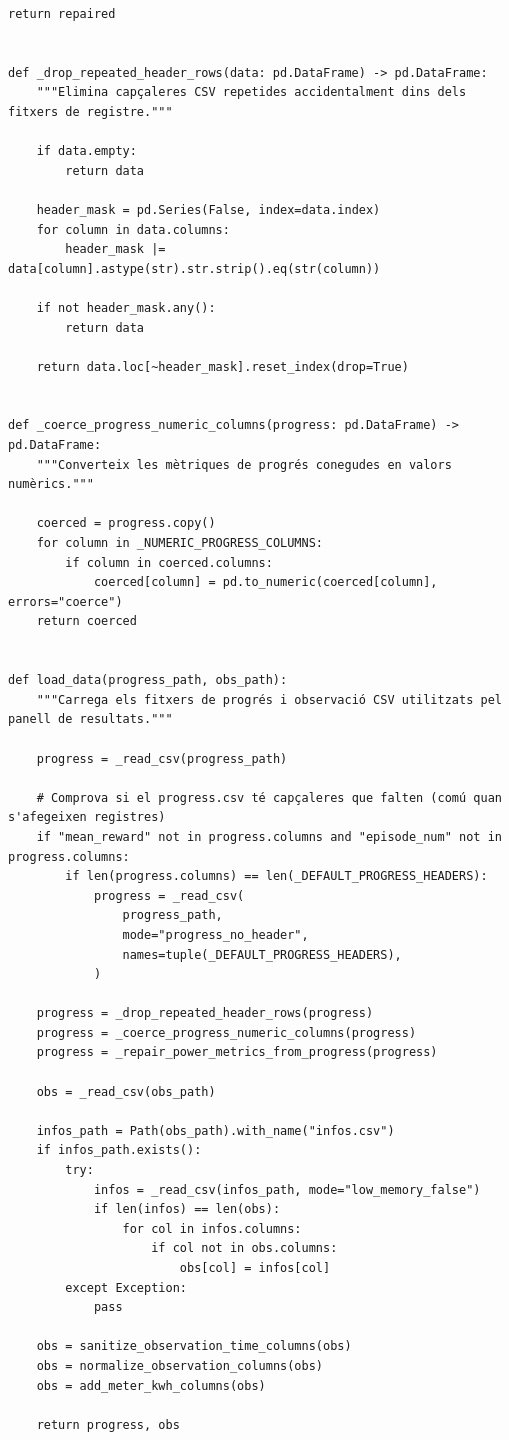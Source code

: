 \documentclass[10pt,a4paper]{article}
\begin{document}
\begin{lstlisting}[style=studioPython,caption={backend/grafics/data\_loader.py},label={lst:backend-grafics-data-loader-py}]
    return repaired


def _drop_repeated_header_rows(data: pd.DataFrame) -> pd.DataFrame:
    """Elimina capçaleres CSV repetides accidentalment dins dels fitxers de registre."""

    if data.empty:
        return data

    header_mask = pd.Series(False, index=data.index)
    for column in data.columns:
        header_mask |= data[column].astype(str).str.strip().eq(str(column))

    if not header_mask.any():
        return data

    return data.loc[~header_mask].reset_index(drop=True)


def _coerce_progress_numeric_columns(progress: pd.DataFrame) -> pd.DataFrame:
    """Converteix les mètriques de progrés conegudes en valors numèrics."""

    coerced = progress.copy()
    for column in _NUMERIC_PROGRESS_COLUMNS:
        if column in coerced.columns:
            coerced[column] = pd.to_numeric(coerced[column], errors="coerce")
    return coerced


def load_data(progress_path, obs_path):
    """Carrega els fitxers de progrés i observació CSV utilitzats pel panell de resultats."""

    progress = _read_csv(progress_path)

    # Comprova si el progress.csv té capçaleres que falten (comú quan s'afegeixen registres)
    if "mean_reward" not in progress.columns and "episode_num" not in progress.columns:
        if len(progress.columns) == len(_DEFAULT_PROGRESS_HEADERS):
            progress = _read_csv(
                progress_path,
                mode="progress_no_header",
                names=tuple(_DEFAULT_PROGRESS_HEADERS),
            )

    progress = _drop_repeated_header_rows(progress)
    progress = _coerce_progress_numeric_columns(progress)
    progress = _repair_power_metrics_from_progress(progress)

    obs = _read_csv(obs_path)

    infos_path = Path(obs_path).with_name("infos.csv")
    if infos_path.exists():
        try:
            infos = _read_csv(infos_path, mode="low_memory_false")
            if len(infos) == len(obs):
                for col in infos.columns:
                    if col not in obs.columns:
                        obs[col] = infos[col]
        except Exception:
            pass

    obs = sanitize_observation_time_columns(obs)
    obs = normalize_observation_columns(obs)
    obs = add_meter_kwh_columns(obs)

    return progress, obs
\end{lstlisting}
\end{document}
